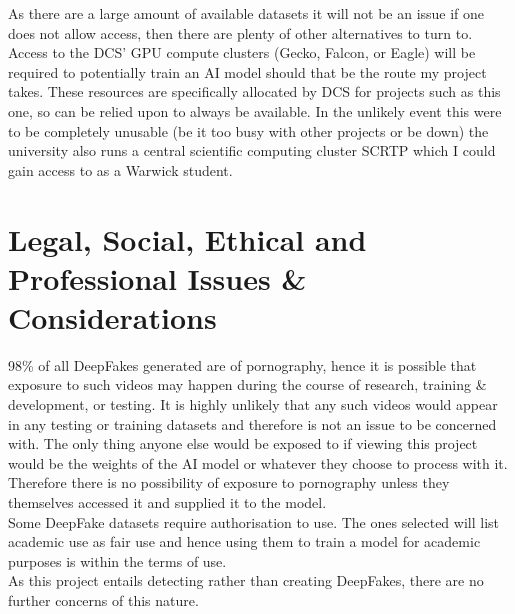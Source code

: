 \documentclass{article}
\begin{document}
As there are a large amount of available datasets it will not be an issue if one does not allow access, then there are plenty of other alternatives to turn to.\\

Access to the DCS' GPU compute clusters (Gecko, Falcon, or Eagle) will be required to potentially train an AI model should that be the route my project takes. These resources are specifically allocated by DCS for projects such as this one, so can be relied upon to always be available. In the unlikely event this were to be completely unusable (be it too busy with other projects or be down) the university also runs a central scientific computing cluster SCRTP which I could gain access to as a Warwick student.


\section{Legal, Social, Ethical and Professional Issues \& Considerations}
98\% of all DeepFakes generated are of pornography\cite{pornography}, hence it is possible that exposure to such videos may happen during the course of research, training \& development, or testing. It is highly unlikely that any such videos would appear in any testing or training datasets and therefore is not an issue to be concerned with. The only thing anyone else would be exposed to if viewing this project would be the weights of the AI model or whatever they choose to process with it. Therefore there is no possibility of exposure to pornography unless they themselves accessed it and supplied it to the model. \\

Some DeepFake datasets require authorisation to use. The ones selected will list academic use as fair use and hence using them to train a model for academic purposes is within the terms of use.\\

As this project entails detecting rather than creating DeepFakes, there are no further concerns of this nature.



\end{document}
